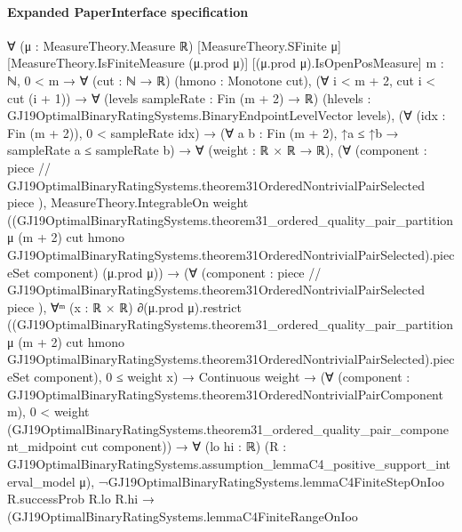 \documentclass[10pt]{article}
\begin{document}
\paragraph{Expanded PaperInterface specification}
\begin{ReviewVerbatim}
∀ (μ : MeasureTheory.Measure ℝ) [MeasureTheory.SFinite μ] [MeasureTheory.IsFiniteMeasure (μ.prod μ)]
  [(μ.prod μ).IsOpenPosMeasure] {m : ℕ},
  0 < m →
    ∀ (cut : ℕ → ℝ) (hmono : Monotone cut),
      (∀ i < m + 2, cut i < cut (i + 1)) →
        ∀ (levels sampleRate : Fin (m + 2) → ℝ)
          (hlevels : GJ19OptimalBinaryRatingSystems.BinaryEndpointLevelVector levels),
          (∀ (idx : Fin (m + 2)), 0 < sampleRate idx) →
            (∀ {a b : Fin (m + 2)}, ↑a ≤ ↑b → sampleRate a ≤ sampleRate b) →
              ∀ (weight : ℝ × ℝ → ℝ),
                (∀
                    (component :
                      { piece // GJ19OptimalBinaryRatingSystems.theorem31OrderedNontrivialPairSelected piece }),
                    MeasureTheory.IntegrableOn weight
                      ((GJ19OptimalBinaryRatingSystems.theorem31_ordered_quality_pair_partition μ (m + 2) cut hmono
                            GJ19OptimalBinaryRatingSystems.theorem31OrderedNontrivialPairSelected).pieceSet
                        component)
                      (μ.prod μ)) →
                  (∀
                      (component :
                        { piece // GJ19OptimalBinaryRatingSystems.theorem31OrderedNontrivialPairSelected piece }),
                      ∀ᵐ (x :
                        ℝ ×
                          ℝ) ∂(μ.prod μ).restrict
                          ((GJ19OptimalBinaryRatingSystems.theorem31_ordered_quality_pair_partition μ (m + 2) cut hmono
                                GJ19OptimalBinaryRatingSystems.theorem31OrderedNontrivialPairSelected).pieceSet
                            component),
                        0 ≤ weight x) →
                    Continuous weight →
                      (∀ (component : GJ19OptimalBinaryRatingSystems.theorem31OrderedNontrivialPairComponent m),
                          0 <
                            weight
                              (GJ19OptimalBinaryRatingSystems.theorem31_ordered_quality_pair_component_midpoint cut
                                component)) →
                        ∀ (lo hi : ℝ)
                          (R : GJ19OptimalBinaryRatingSystems.assumption_lemmaC4_positive_support_interval_model μ),
                          ¬GJ19OptimalBinaryRatingSystems.lemmaC4FiniteStepOnIoo R.successProb R.lo R.hi →
                            (GJ19OptimalBinaryRatingSystems.lemmaC4FiniteRangeOnIoo

\end{ReviewVerbatim}
\end{document}
